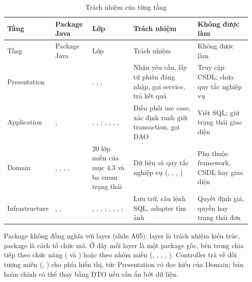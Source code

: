 \documentclass[12pt,a4paper]{article}
\begin{document}
\begin{longtable}{@{}P{2.1cm}P{3.5cm}P{3.9cm}P{3.1cm}P{2.5cm}@{}}
\caption{Trách nhiệm của từng tầng}\label{tab:layers}\\
\toprule
Tầng & Package Java & Lớp & Trách nhiệm & Không được làm\\
\midrule
\endfirsthead
\toprule
Tầng & Package Java & Lớp & Trách nhiệm & Không được làm\\
\midrule
\endhead
\small Presentation & \small{} & \small{}, , ,  & \small Nhận yêu cầu, lấy  từ phiên đăng nhập, gọi service, trả kết quả & \small Truy cập CSDL; chứa quy tắc nghiệp vụ\\
\small Application & \small{},  & \small{}, , ; , , , ,  & \small Điều phối use case, xác định ranh giới transaction, gọi DAO & \small Viết SQL; giữ trạng thái giao diện\\
\small Domain & \small{}, , , ,  & \small 20 lớp miền của mục 4.3 và ba enum trạng thái & \small Dữ liệu và quy tắc nghiệp vụ (, , , ) & \small Phụ thuộc framework, CSDL hay giao diện\\
\small Infrastructure & \small{}, ,  & \small{}, , , ; , , , ;  & \small Lưu trữ, câu lệnh SQL, adapter tìm ảnh & \small Quyết định giá, quyền hay trạng thái đơn\\
\bottomrule
\end{longtable}

Package không đồng nghĩa với layer (slide A05): layer là trách nhiệm kiến trúc, package là cách tổ chức
mã. Ở đây mỗi layer là một package gốc, bên trong chia tiếp theo chức năng ( và
) hoặc theo nhóm miền (, , , ,
). Controller trả về đối tượng miền (, ) cho phía hiển thị, tức
Presentation có đọc kiểu của Domain; bản hoàn chỉnh có thể thay bằng DTO nếu cần ẩn bớt dữ liệu.
\end{document}
